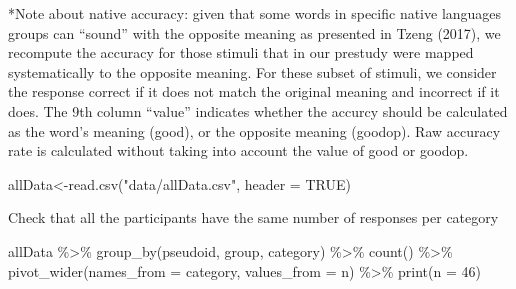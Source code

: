 \documentclass[
]{article}
\newenvironment{Shaded}{\begin{snugshade}}{\end{snugshade}}
\newcommand{\AttributeTok}[1]{\textcolor[rgb]{0.77,0.63,0.00}{#1}}
\newcommand{\ConstantTok}[1]{\textcolor[rgb]{0.00,0.00,0.00}{#1}}
\newcommand{\DecValTok}[1]{\textcolor[rgb]{0.00,0.00,0.81}{#1}}
\newcommand{\FunctionTok}[1]{\textcolor[rgb]{0.00,0.00,0.00}{#1}}
\newcommand{\NormalTok}[1]{#1}
\newcommand{\OtherTok}[1]{\textcolor[rgb]{0.56,0.35,0.01}{#1}}
\newcommand{\SpecialCharTok}[1]{\textcolor[rgb]{0.00,0.00,0.00}{#1}}
\newcommand{\StringTok}[1]{\textcolor[rgb]{0.31,0.60,0.02}{#1}}
\begin{document}
*Note about native accuracy: given that some words in specific native
languages groups can ``sound'' with the opposite meaning as presented in
Tzeng (2017), we recompute the accuracy for those stimuli that in our
prestudy were mapped systematically to the opposite meaning. For these
subset of stimuli, we consider the response correct if it does not match
the original meaning and incorrect if it does. The 9th column ``value''
indicates whether the accurcy should be calculated as the word's meaning
(good), or the opposite meaning (goodop). Raw accuracy rate is
calculated without taking into account the value of good or goodop.

\begin{Shaded}
\begin{Highlighting}[]
\NormalTok{allData}\OtherTok{\textless{}{-}}\FunctionTok{read.csv}\NormalTok{(}\StringTok{"data/allData.csv"}\NormalTok{, }\AttributeTok{header =} \ConstantTok{TRUE}\NormalTok{)}
\end{Highlighting}
\end{Shaded}

Check that all the participants have the same number of responses per
category

\begin{Shaded}
\begin{Highlighting}[]
\NormalTok{allData }\SpecialCharTok{\%\textgreater{}\%} 
  \FunctionTok{group\_by}\NormalTok{(pseudoid, group, category) }\SpecialCharTok{\%\textgreater{}\%} 
  \FunctionTok{count}\NormalTok{() }\SpecialCharTok{\%\textgreater{}\%} 
  \FunctionTok{pivot\_wider}\NormalTok{(}\AttributeTok{names\_from =}\NormalTok{ category, }\AttributeTok{values\_from =}\NormalTok{ n) }\SpecialCharTok{\%\textgreater{}\%} 
  \FunctionTok{print}\NormalTok{(}\AttributeTok{n =} \DecValTok{46}\NormalTok{)}
\end{Highlighting}
\end{Shaded}
\end{document}
